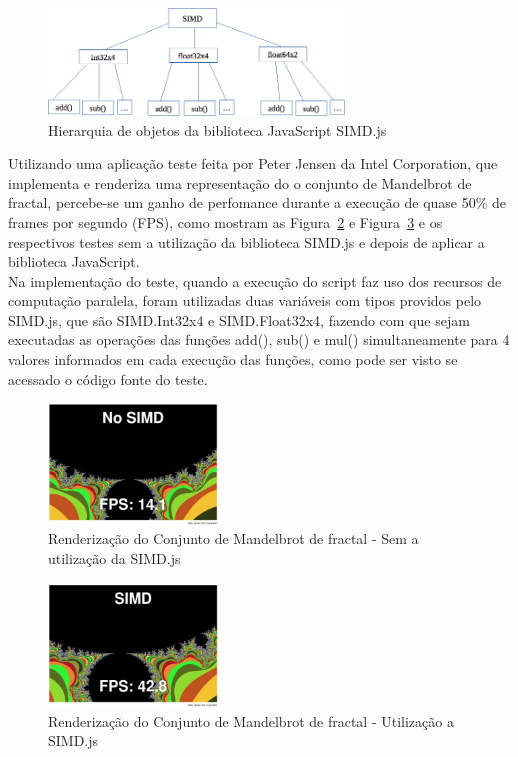 \documentclass[12pt,a4paper]{article}
\begin{document}
\begin{figure}[h]
	\centering
	\includegraphics[width=0.7\textwidth]{figura7.png}
	\caption{Hierarquia de objetos da biblioteca JavaScript SIMD.js}
	\label{fig:figura7}
\end{figure}

Utilizando uma aplicação teste feita por Peter Jensen da Intel Corporation, que implementa e renderiza uma representação do o conjunto de Mandelbrot de fractal, percebe-se um ganho de perfomance durante a execução de quase 50\% de frames por segundo (FPS), como mostram as Figura~\ref{fig:figura8} e Figura~\ref{fig:figura9} e os respectivos testes sem a utilização da biblioteca SIMD.js e depois de aplicar a biblioteca JavaScript. \\

Na implementação do teste, quando a execução do script faz uso dos recursos de computação paralela, foram utilizadas duas variáveis com tipos providos pelo SIMD.js, que são SIMD.Int32x4 e SIMD.Float32x4, fazendo com que sejam executadas as operações das funções add(), sub() e mul() simultaneamente para 4 valores informados em cada execução das funções, como pode ser visto se acessado o código fonte do teste. \\

\begin{figure}[h]
	\centering
	\includegraphics[width=0.4\textwidth]{figura8.png}
	\caption{Renderização do Conjunto de Mandelbrot de fractal - Sem a utilização da SIMD.js}
	\label{fig:figura8}
\end{figure}

\begin{figure}[h]
	\centering
	\includegraphics[width=0.4\textwidth]{figura9.png}
	\caption{Renderização do Conjunto de Mandelbrot de fractal - Utilização a SIMD.js}
	\label{fig:figura9}
\end{figure}
\end{document}

